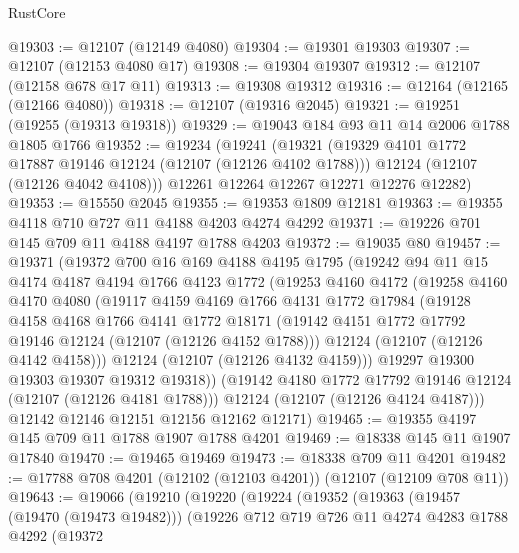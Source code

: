 \begin{lexlean}{RustCore}
\begin{coremodule}
@19303 := @12107 (@12149 @4080)
@19304 := @19301 @19303
@19307 := @12107 (@12153 @4080 @17)
@19308 := @19304 @19307
@19312 := @12107 (@12158 @678 @17 @11)
@19313 := @19308 @19312
@19316 := @12164 (@12165 (@12166 @4080))
@19318 := @12107 (@19316 @2045)
@19321 := @19251 (@19255 (@19313 @19318))
@19329 := @19043 @184 @93 @11 @14 @2006 @1788 @1805 @1766
@19352 := @19234
    (@19241
      (@19321
        (@19329 @4101 @1772 @17887 @19146 @12124 (@12107 (@12126 @4102 @1788)))
        @12124
        (@12107 (@12126 @4042 @4108)))
      @12261
      @12264
      @12267
      @12271
      @12276
      @12282)
@19353 := @15550 @2045
@19355 := @19353 @1809 @12181
@19363 := @19355 @4118 @710 @727 @11 @4188 @4203 @4274 @4292
@19371 := @19226 @701 @145 @709 @11 @4188 @4197 @1788 @4203
@19372 := @19035 @80
@19457 := @19371
    (@19372
      @700
      @16
      @169
      @4188
      @4195
      @1795
      (@19242
        @94
        @11
        @15
        @4174
        @4187
        @4194
        @1766
        @4123
        @1772
        (@19253
          @4160
          @4172
          (@19258
            @4160
            @4170
            @4080
            (@19117
              @4159
              @4169
              @1766
              @4131
              @1772
              @17984
              (@19128
                @4158
                @4168
                @1766
                @4141
                @1772
                @18171
                (@19142 @4151 @1772 @17792 @19146 @12124 (@12107 (@12126 @4152 @1788)))
                @12124
                (@12107 (@12126 @4142 @4158)))
              @12124
              (@12107 (@12126 @4132 @4159)))
            @19297
            @19300
            @19303
            @19307
            @19312
            @19318))
        (@19142 @4180 @1772 @17792 @19146 @12124 (@12107 (@12126 @4181 @1788)))
        @12124
        (@12107 (@12126 @4124 @4187)))
      @12142
      @12146
      @12151
      @12156
      @12162
      @12171)
@19465 := @19355 @4197 @145 @709 @11 @1788 @1907 @1788 @4201
@19469 := @18338 @145 @11 @1907 @17840
@19470 := @19465 @19469
@19473 := @18338 @709 @11 @4201
@19482 := @17788 @708 @4201 (@12102 (@12103 @4201)) (@12107 (@12109 @708 @11))
@19643 := @19066
    (@19210
      (@19220
        (@19224
          (@19352
            (@19363
              (@19457 (@19470 (@19473 @19482)))
              (@19226
                @712
                @719
                @726
                @11
                @4274
                @4283
                @1788
                @4292
                (@19372

\end{coremodule}
\end{lexlean}
